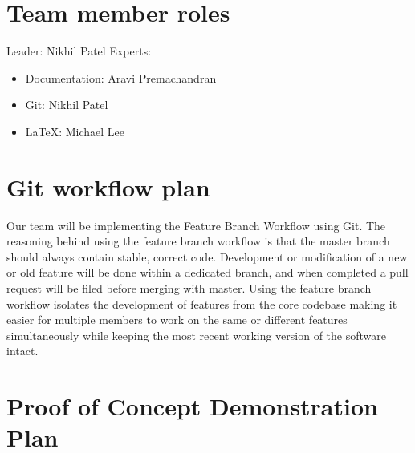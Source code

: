 \documentclass{article}
\begin{document}
\newpage

\section{Team member roles}

\noindent Leader: Nikhil Patel \newline \noindent Experts: \vspace{-2mm}
\begin{itemize} \itemsep0em \item Documentation: Aravi Premachandran \item Git:
Nikhil Patel \item LaTeX: Michael Lee \end{itemize}

\section{Git workflow plan} 

\noindent Our team will be implementing the Feature Branch Workflow using Git.
The reasoning behind using the feature branch workflow is that the master branch
should always contain stable, correct code. Development or modification of a new
or old feature will be done within a dedicated branch, and when completed a pull
request will be filed before merging with master. Using the feature branch
workflow isolates the development of features from the core codebase making it
easier for multiple members to work on the same or different features
simultaneously while keeping the most recent working version of the software
intact.


\section{Proof of Concept Demonstration Plan}
\end{document}
